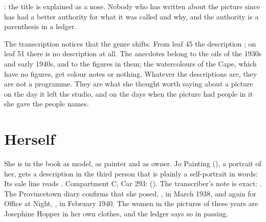 \noindent {}: the title is explained as a nose. Nobody who has written about the picture since has had a better authority for what it was called and why, and the authority is a parenthesis in a ledger.

The transcription notices that the genre shifts. From leaf 45 the description ; on leaf 51 there is no description at all. The anecdotes belong to the oils of the 1930s and early 1940s, and to the figures in them; the watercolours of the Cape, which have no figures, get colour notes or nothing. Whatever the descriptions are, they are not a programme. They are what she thought worth saying about a picture on the day it left the studio, and on the days when the picture had people in it she gave the people names.



\section{Herself}

She is in the book as model, as painter and as owner. Jo Painting (), a portrait of her, gets a description in the third person that is plainly a self-portrait in words:  Its sale line reads . Compartment C, Car 293:  (). The transcriber's note is exact: . The Provincetown diary confirms that she posed, , in March 1938, and again for Office at Night, , in February 1940. The women in the pictures of these years are Josephine Hopper in her own clothes, and the ledger says so in passing.

